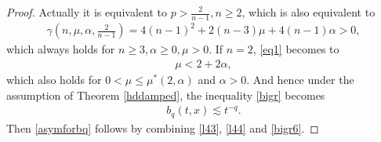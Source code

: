 \documentclass[review]{elsarticle}
\newtheorem{proof}{Proof}[section]
\begin{document}
\begin{proof}
Actually it is equivalent to $p>\frac 2{n-1}, n\ge 2$, which is also equivalent to
\begin{equation}\label{eq1}
\begin{aligned}
\gamma\left(n, \mu, \alpha, \frac 2{n-1}\right)=4(n-1)^2+2(n-3)\mu+4(n-1)\alpha
>0,
\end{aligned}
\end{equation}
which always holds for $n\ge 3, \alpha\ge 0, \mu>0$. If $n=2$, \eqref{eq1} becomes to
\begin{equation}\label{eq2}
\begin{aligned}
\mu<2+2\alpha,
\end{aligned}
\end{equation}
which also holds for $0<\mu\le \mu^*(2, \alpha)$ and $\alpha>0$. And hence under the assumption of Theorem \ref{hddamped}, the inequality \eqref{bigr} becomes
\begin{equation}\label{bigr6}
\begin{aligned}
b_q(t, x)\lesssim t^{-q}.
\end{aligned}
\end{equation}
Then \eqref{asymforbq} follows by combining \eqref{l43}, \eqref{l44} and \eqref{bigr6}.


\end{proof}
\end{document}

